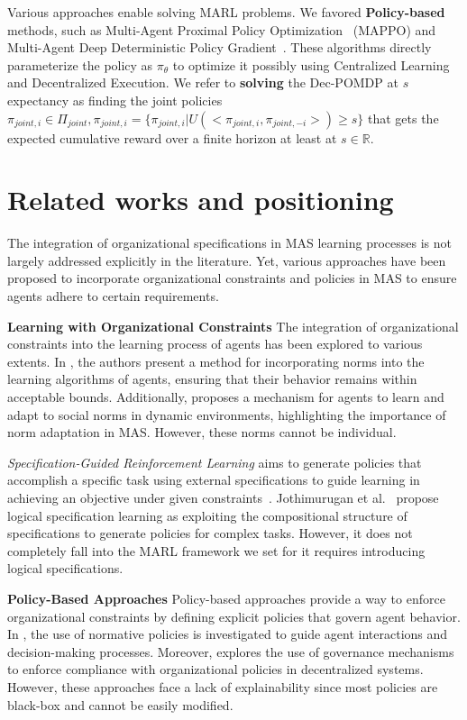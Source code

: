 \documentclass[sigconf,anonymous]{aamas}
\begin{document}
Various approaches enable solving MARL problems. We favored \textbf{Policy-based} methods, such as Multi-Agent Proximal Policy Optimization~\cite{yu2022surprising} (MAPPO) and Multi-Agent Deep Deterministic Policy Gradient~\cite{Lowe2017}. These algorithms directly parameterize the policy as $\pi_\theta$ to optimize it possibly using Centralized Learning and Decentralized Execution.
We refer to \textbf{solving} the Dec-POMDP at $s$ expectancy as finding the joint policies $\pi_{joint,i} \in \Pi_{joint}, \pi_{joint,i} = \{\pi_{joint,i} | U(<\pi_{joint,i},\pi_{joint,-i}>) \geq s\}$ that gets the expected cumulative reward over a finite horizon at least at $s \in \mathbb{R}$.


\section{Related works and positioning}\label{sec:related_works}

The integration of organizational specifications in MAS learning processes is not largely addressed explicitly in the literature. Yet, various approaches have been proposed to incorporate organizational constraints and policies in MAS to ensure agents adhere to certain requirements.

\textbf{Learning with Organizational Constraints} \quad
%
The integration of organizational constraints into the learning process of agents has been explored to various extents. In \cite{cruz2020norms}, the authors present a method for incorporating norms into the learning algorithms of agents, ensuring that their behavior remains within acceptable bounds. Additionally, \cite{villatoro2011social} proposes a mechanism for agents to learn and adapt to social norms in dynamic environments, highlighting the importance of norm adaptation in MAS. However, these norms cannot be individual.

\emph{Specification-Guided Reinforcement Learning} aims to generate policies that accomplish a specific task using external specifications to guide learning in achieving an objective under given constraints~\cite{Bansal2022}. Jothimurugan et al.~\cite{Jothimurugan2021} propose logical specification learning as exploiting the compositional structure of specifications to generate policies for complex tasks. However, it does not completely fall into the MARL framework we set for it requires introducing logical specifications.

\textbf{Policy-Based Approaches} \quad
%
Policy-based approaches provide a way to enforce organizational constraints by defining explicit policies that govern agent behavior. In \cite{krupanski2015norm}, the use of normative policies is investigated to guide agent interactions and decision-making processes. Moreover, \cite{vos2020governing} explores the use of governance mechanisms to enforce compliance with organizational policies in decentralized systems. However, these approaches face a lack of explainability since most policies are black-box and cannot be easily modified.
\end{document}
